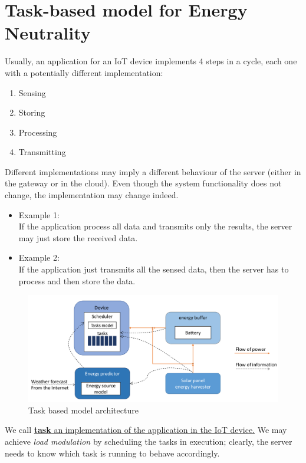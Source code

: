 \section{Task-based model for Energy Neutrality}
Usually, an application for an IoT device implements 4 steps in a cycle, each one with a potentially different implementation:
\begin{enumerate}
   \item Sensing
   \item Storing
   \item Processing
   \item Transmitting
\end{enumerate}

Different implementations may imply a different
behaviour of the server (either in the gateway or in the
cloud).
Even though the system functionality does not change, the implementation may change indeed.
\begin{itemize}
   \item 
   Example 1:\\
   If the application process all data and transmits only the
   results, the server may just store the received data.
   \item Example 2:\\
   If the application just transmits all the sensed data, then the server has to process and then store the
   data.
\end{itemize}


   \begin{figure}[htbp]
      \centering
      \includegraphics{images/taskmodel.png}
      \caption{Task based model architecture}
      \label{fig:taskmodel}
   \end{figure}

   We call \ul{\textbf{task} an implementation of the application in the IoT device.}
   We may achieve \textit{load modulation} by scheduling the tasks in execution; clearly, the server needs to know which task is running to behave accordingly.
   
